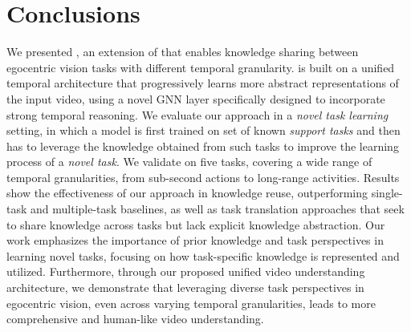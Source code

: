 \section{Conclusions}\label{sec:conclusions}
We presented \ours, an extension of \ourscvpr that enables knowledge sharing between egocentric vision tasks with different temporal granularity.
%
\ours is built on a unified temporal architecture that progressively learns more abstract representations of the input video, using a novel GNN layer specifically designed to incorporate strong temporal reasoning.
We evaluate our approach in a \emph{novel task learning} setting, in which a model is first trained on set of known \emph{support tasks} and then has to leverage the knowledge obtained from such tasks to improve the learning process of a \emph{novel task}.
%
We validate \ours on five \egofourd tasks, covering a wide range of temporal granularities, from sub-second actions to long-range activities. Results show the effectiveness of our approach in knowledge reuse, outperforming single-task and multiple-task baselines, as well as task translation approaches that seek to share knowledge across tasks but lack explicit knowledge abstraction.
% 
Our work emphasizes the importance of prior knowledge and task perspectives in learning novel tasks, focusing on how task-specific knowledge is represented and utilized. Furthermore, through our proposed unified video understanding architecture, we demonstrate that leveraging diverse task perspectives in egocentric vision, even across varying temporal granularities, leads to more comprehensive and human-like video understanding.